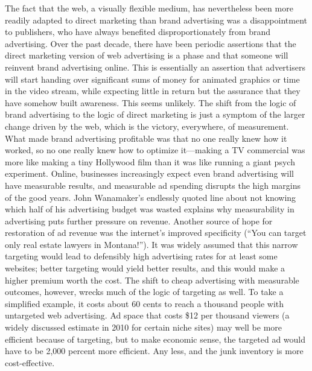 The fact that the web, a visually flexible medium, has nevertheless been more
readily adapted to direct marketing than brand advertising was a disappointment
to publishers, who have always benefited disproportionately from brand advertising.
Over the past decade, there have been periodic assertions that the direct
marketing version of web advertising is a phase and that someone will reinvent
brand advertising online. This is essentially an assertion that advertisers will start
handing over significant sums of money for animated graphics or time in the
video stream, while expecting little in return but the assurance that they have
somehow built awareness.
This seems unlikely. The shift from the logic of brand advertising to the logic of
direct marketing is just a symptom of the larger change driven by the web, which
is the victory, everywhere, of measurement. What made brand advertising profitable
was that no one really knew how it worked, so no one really knew how to
optimize it—making a TV commercial was more like making a tiny Hollywood
film than it was like running a giant psych experiment.
Online, businesses increasingly expect even brand advertising will have measurable
results, and measurable ad spending disrupts the high margins of the good
years. John Wanamaker’s endlessly quoted line about not knowing which half of
his advertising budget was wasted explains why measurability in advertising puts
further pressure on revenue.
Another source of hope for restoration of ad revenue was the internet’s improved
specificity (``You can target only real estate lawyers in Montana!''). It was widely
assumed that this narrow targeting would lead to defensibly high advertising rates
for at least some websites; better targeting would yield better results, and this
would make a higher premium worth the cost.
The shift to cheap advertising with measurable outcomes, however, wrecks much
of the logic of targeting as well. To take a simplified example, it costs about 60
cents to reach a thousand people with untargeted web advertising. Ad space that
costs \$12 per thousand viewers (a widely discussed estimate in 2010 for certain
niche sites) may well be more efficient because of targeting, but to make economic
sense, the targeted ad would have to be 2,000 percent more efficient. Any
less, and the junk inventory is more cost-effective.

